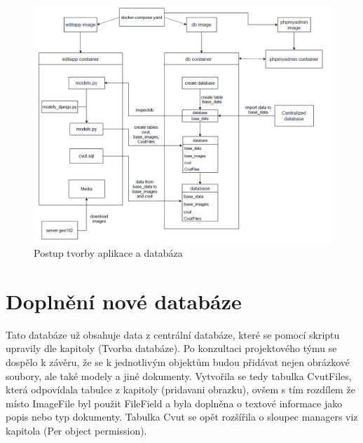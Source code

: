 \begin{figure}[H] \centering
    \includegraphics[width=400pt]{./pictures/diagram-docker.PNG}
    \caption[Postup tvorby aplikace a databáza]{Postup tvorby aplikace a databáza}
	\label{fig:Postup tvorby aplikace a databáza}              
\end{figure}

\newpage

\section{Doplnění nové databáze}

Tato databáze už obsahuje data z centrální databáze, které se pomocí skriptu upravily dle kapitoly (Tvorba databáze). Po konzultaci projektového týmu se dospělo k závěru, že se k jednotlivým objektům budou přidávat nejen obrázkové soubory, ale také modely a jiné dokumenty. Vytvořila se tedy tabulka CvutFiles, která odpovídala tabulce z kapitoly (pridavani obrazku), ovšem s tím rozdílem že místo ImageFile byl použit FileField a byla doplněna o textové informace jako popis nebo typ dokumenty. Tabulka Cvut se opět rozšířila o sloupec managers viz kapitola (Per object permission).

